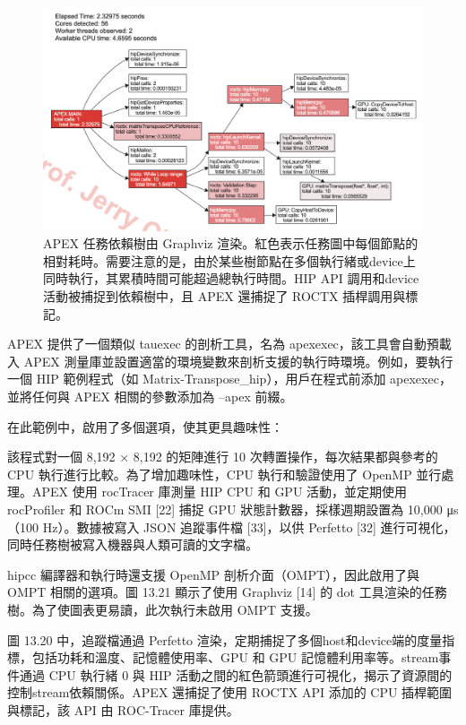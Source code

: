 \begin{figure}
    \centering
    \includegraphics[width=0.9\linewidth]{FileAusiliari/Screenshots/Figure13-21.png}
    \caption{APEX 任務依賴樹由 Graphviz 渲染。紅色表示任務圖中每個節點的相對耗時。需要注意的是，由於某些樹節點在多個執行緒或device上同時執行，其累積時間可能超過總執行時間。HIP API 調用和device活動被捕捉到依賴樹中，且 APEX 還捕捉了 ROCTX 插桿調用與標記。}
    \label{fig:PAPI21}
\end{figure}

APEX 提供了一個類似 tauexec 的剖析工具，名為 apexexec，該工具會自動預載入 APEX 測量庫並設置適當的環境變數來剖析支援的執行時環境。例如，要執行一個 HIP 範例程式（如 Matrix-Transpose\_hip），用戶在程式前添加 apexexec，並將任何與 APEX 相關的參數添加為 --apex 前綴。

在此範例中，啟用了多個選項，使其更具趣味性：

該程式對一個 8,192 × 8,192 的矩陣進行 10 次轉置操作，每次結果都與參考的 CPU 執行進行比較。為了增加趣味性，CPU 執行和驗證使用了 OpenMP 並行處理。APEX 使用 rocTracer 庫測量 HIP CPU 和 GPU 活動，並定期使用 rocProfiler 和 ROCm SMI [22] 捕捉 GPU 狀態計數器，採樣週期設置為 10,000 μs（100 Hz）。數據被寫入 JSON 追蹤事件檔 [33]，以供 Perfetto [32] 進行可視化，同時任務樹被寫入機器與人類可讀的文字檔。

hipcc 編譯器和執行時還支援 OpenMP 剖析介面（OMPT），因此啟用了與 OMPT 相關的選項。圖 13.21 顯示了使用 Graphviz [14] 的 dot 工具渲染的任務樹。為了使圖表更易讀，此次執行未啟用 OMPT 支援。

圖 13.20 中，追蹤檔通過 Perfetto 渲染，定期捕捉了多個host和device端的度量指標，包括功耗和溫度、記憶體使用率、GPU 和 GPU 記憶體利用率等。stream事件通過 CPU 執行緒 0 與 HIP 活動之間的紅色箭頭進行可視化，揭示了資源間的控制stream依賴關係。APEX 還捕捉了使用 ROCTX API 添加的 CPU 插桿範圍與標記，該 API 由 ROC-Tracer 庫提供。


